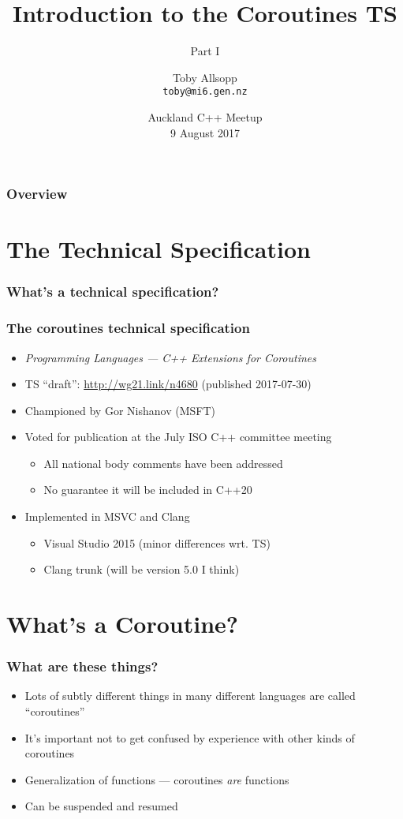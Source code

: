 \documentclass[aspectratio=43]{beamer}
\date{Auckland C++ Meetup\\9 August 2017}
\title{Introduction to the Coroutines TS}
\subtitle{Part I}
\author[Toby Allsopp]{Toby Allsopp\\\texttt{toby@mi6.gen.nz}}
\begin{document}
\frame{\titlepage}

\begin{frame}
  \frametitle{Overview}
  \tableofcontents
\end{frame}

\section{The Technical Specification}

\begin{frame}
  \frametitle{What's a technical specification?}
\end{frame}

\begin{frame}
  \frametitle{The coroutines technical specification}
  \begin{itemize}
  \item \emph{Programming Languages — C++ Extensions for Coroutines}
  \item TS ``draft'': \url{http://wg21.link/n4680} (published 2017-07-30)
  \item Championed by Gor Nishanov (MSFT)
  \item Voted for publication at the July ISO C++ committee meeting
    \begin{itemize}
    \item All national body comments have been addressed
    \item No guarantee it will be included in C++20
    \end{itemize}
    \pause
  \item Implemented in MSVC and Clang
    \begin{itemize}
    \item Visual Studio 2015 (minor differences wrt. TS)
    \item Clang trunk (will be version 5.0 I think)
    \end{itemize}
  \end{itemize}
\end{frame}


\section{What's a Coroutine?}

\begin{frame}
  \frametitle{What are these things?}
  \begin{itemize}
  \item Lots of subtly different things in many different languages are called ``coroutines''
  \item It's important not to get confused by experience with other kinds of coroutines
    \pause
  \item Generalization of functions --- coroutines \emph{are} functions
  \item Can be suspended and resumed
  \end{itemize}
\end{frame}
\end{document}
